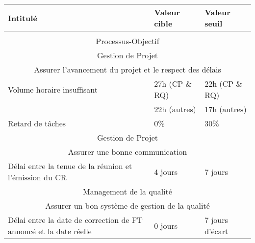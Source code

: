 \documentclass[asi]{picInsa}
\begin{document}
\begin{table}

\begin{tabular}[H]{|p{}|p{}|p{}|}
	\hline
		\rowcolor[gray]{0.45} Intitulé & Valeur cible & Valeur seuil \\\hline
	\rowcolor[gray]{1}
	\multicolumn{3}{|c|}{\cellcolor[gray]{0.65} Indicateurs hebdomadaires} \\\hline

	\multicolumn{3}{|c|}{Processus-Objectif} \\\hline
	\multicolumn{3}{|c|}{\cellcolor[gray]{0.85} Gestion de Projet} \\
	\multicolumn{3}{|c|}{\cellcolor[gray]{0.85} Assurer l'avancement du projet et le respect des délais} \\\hline
	Volume horaire insuffisant & 27h (CP \& RQ) & 22h (CP \& RQ)  \\
	 & 22h (autres) & 17h (autres)  \\\hline
	Retard de tâches & 0\% & 30\% \\\hline
	\multicolumn{3}{|c|}{\cellcolor[gray]{0.85} Gestion de Projet} \\
	\multicolumn{3}{|c|}{\cellcolor[gray]{0.85} Assurer une bonne communication} \\\hline
	Délai entre la tenue de la réunion et l'émission du CR & 4 jours & 7 jours \\\hline
	\multicolumn{3}{|c|}{\cellcolor[gray]{0.85} Management de la qualité} \\
	\multicolumn{3}{|c|}{\cellcolor[gray]{0.85} Assurer un bon système de gestion de la qualité} \\\hline
	Délai entre la date de correction de FT annoncé et la date réelle & 0 jours & 7 jours d'écart \\\hline
	

\end{tabular}
\end{table}
\end{document}
